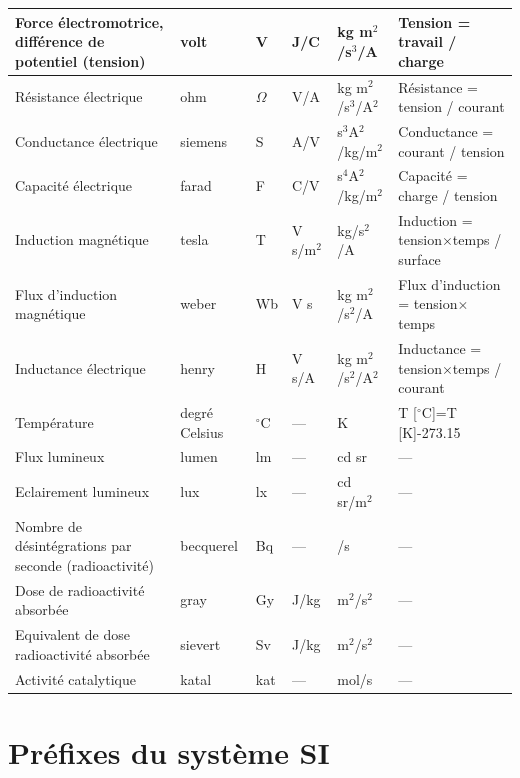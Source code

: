 \begin{center}
\begin{tabular}[t]{>{\pbs\raggedright}p{28mm}
                    >{\pbs\centering}p{17mm}
                    >{\pbs\centering}p{11mm}
                    >{\pbs\centering}p{22mm}
                    >{\pbs\centering}p{22mm}
                    >{\pbs\raggedright}p{32mm}}
\hline
Force électromotrice, différence de potentiel (tension) & volt & V & J/C & kg m$^2$/s$^3$/A & Tension = travail / charge
\\ \hline
Résistance électrique & ohm & $\Omega$ & V/A & kg m$^2$/s$^3$/A$^2$ & Résistance =  tension / courant
\\ \hline
Conductance électrique & siemens & S	& A/V & s$^3$A$^2$/kg/m$^2$ & Conductance = courant / tension
\\ \hline
Capacité électrique & farad & F & C/V & s$^4$A$^2$/kg/m$^2$ & Capacité = charge / tension
\\ \hline
Induction magnétique & tesla & T	& V s/m$^2$ & kg/s$^2$/A & Induction = tension$\times$temps / surface
\\ \hline
Flux d'induction magnétique & weber & Wb	& V s & kg m$^2$/s$^2$/A & Flux d'induction = tension$\times$temps
\\ \hline
Inductance électrique & henry & H & V s/A & kg m$^2$/s$^2$/A$^2$ & Inductance = tension$\times$temps / courant
\\ \hline
Température & degré Celsius & $^{\circ}$C & --- & K & T [$^{\circ}$C]=T [K]-273.15
\\ \hline
Flux lumineux & lumen & lm & --- & cd sr & ---
\\ \hline
Eclairement lumineux & lux & lx & --- & cd sr/m$^2$ & ---
\\ \hline
Nombre de désintégrations par seconde (radioactivité) & becquerel & Bq & --- & 1/s & ---
\\ \hline
Dose de radioactivité absorbée & gray & Gy & J/kg & m$^2$/s$^2$ & ---
\\ \hline
Equivalent de dose radioactivité absorbée & sievert & Sv & J/kg & m$^2$/s$^2$ & ---
\\ \hline
Activité catalytique & katal & kat & --- & mol/s & ---
\\ \hline\hline
\end{tabular}
\end{center}

\section{Préfixes du système SI}

